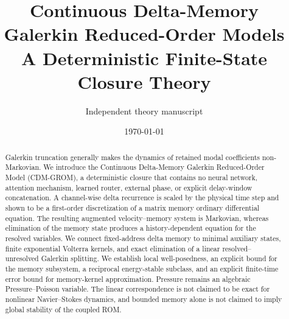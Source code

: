 \documentclass[11pt]{article}
\title{Continuous Delta-Memory Galerkin Reduced-Order Models\\
       A Deterministic Finite-State Closure Theory}
\author{Independent theory manuscript}
\date{\today}
\theoremstyle{plain}
\theoremstyle{remark}
\begin{document}
\maketitle

\begin{abstract}
Galerkin truncation generally makes the dynamics of retained modal
coefficients non-Markovian. We introduce the Continuous Delta-Memory Galerkin
Reduced-Order Model (CDM-GROM), a deterministic closure that contains no
neural network, attention mechanism, learned router, external phase, or
explicit delay-window concatenation. A channel-wise delta recurrence is
scaled by the physical time step and shown to be a first-order discretization
of a matrix memory ordinary differential equation. The resulting augmented
velocity--memory system is Markovian, whereas elimination of the memory state
produces a history-dependent equation for the resolved variables. We connect
fixed-address delta memory to minimal auxiliary states, finite exponential
Volterra kernels, and exact elimination of a linear resolved--unresolved
Galerkin splitting. We establish local well-posedness, an explicit bound for
the memory subsystem, a reciprocal energy-stable subclass, and an explicit
finite-time error bound for memory-kernel approximation. Pressure remains an
algebraic Pressure--Poisson variable. The linear correspondence is not
claimed to be exact for nonlinear Navier--Stokes dynamics, and bounded memory
alone is not claimed to imply global stability of the coupled ROM.
\end{abstract}

\setcounter{section}{1}


\appendix

\end{document}
